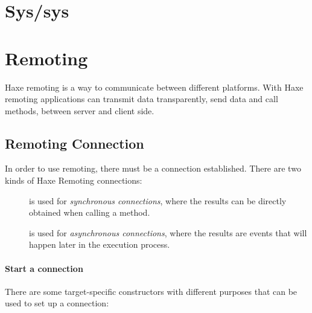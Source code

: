 \section{Sys/sys}
\label{std-sys}

\section{Remoting}
\label{std-remoting}

Haxe remoting is a way to communicate between different platforms. With Haxe remoting applications can transmit data transparently, send data and call methods, between server and client side.

\subsection{Remoting Connection}
\label{std-remoting-connection}

In order to use remoting, there must be a connection established. There are two kinds of Haxe Remoting connections: 
\begin{description}
	\item[] is used for \emph{synchronous connections}, where the results can be directly obtained when calling a method. 
	\item[] is used for \emph{asynchronous connections}, where the results are events that will happen later in the execution process.
\end{description}

\paragraph{Start a connection}
There are some target-specific constructors with different purposes that can be used to set up a connection:


